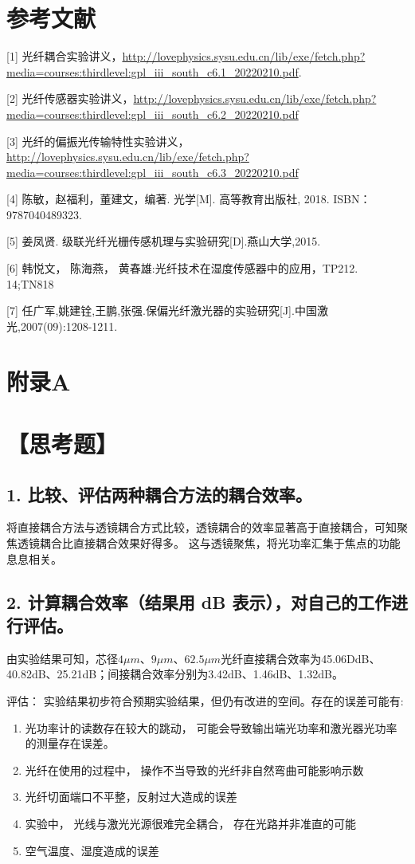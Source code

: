 \documentclass[10pt,a4paper,twoside,UTF8]{ctexart}
\begin{document}
\newpage
\section*{参考文献}
% 
% 

[1] 光纤耦合实验讲义，\url{http://lovephysics.sysu.edu.cn/lib/exe/fetch.php?media=courses:thirdlevel:gpl_iii_south_c6.1_20220210.pdf}.

[2] 光纤传感器实验讲义，\url{http://lovephysics.sysu.edu.cn/lib/exe/fetch.php?media=courses:thirdlevel:gpl_iii_south_c6.2_20220210.pdf}

[3] 光纤的偏振光传输特性实验讲义，\url{http://lovephysics.sysu.edu.cn/lib/exe/fetch.php?media=courses:thirdlevel:gpl_iii_south_c6.3_20220210.pdf}

[4] 陈敏，赵福利，董建文，编著. 光学[M]. 高等教育出版社, 2018. ISBN：9787040489323.

[5] 姜凤贤. 级联光纤光栅传感机理与实验研究[D].燕山大学,2015.

[6] 韩悦文， 陈海燕， 黄春雄:光纤技术在湿度传感器中的应用，TP212. 14;TN818

[7] 任广军,姚建铨,王鹏,张强.保偏光纤激光器的实验研究[J].中国激光,2007(09):1208-1211.


\clearpage

	
\section*{\LARGE 附录A}
\section*{【思考题】}
\subsection*{1. 比较、评估两种耦合方法的耦合效率。}
将直接耦合方法与透镜耦合方式比较，透镜耦合的效率显著高于直接耦合，可知聚焦透镜耦合比直接耦合效果好得多。
这与透镜聚焦，将光功率汇集于焦点的功能息息相关。

\subsection*{2. 计算耦合效率（结果用 dB 表示），对自己的工作进行评估。}
由实验结果可知，芯径$4\mu m、9\mu m、62.5\mu m$光纤直接耦合效率为45.06DdB、40.82dB、25.21dB；间接耦合效率分别为3.42dB、1.46dB、1.32dB。

评估： 实验结果初步符合预期实验结果，但仍有改进的空间。存在的误差可能有:
\begin{enumerate}
	\item 光功率计的读数存在较大的跳动， 可能会导致输出端光功率和激光器光功率的测量存在误差。
	\item 光纤在使用的过程中， 操作不当导致的光纤非自然弯曲可能影响示数
	\item 光纤切面端口不平整，反射过大造成的误差
	\item 实验中， 光线与激光光源很难完全耦合， 存在光路并非准直的可能
	\item 空气温度、湿度造成的误差
\end{enumerate}
\end{document}
